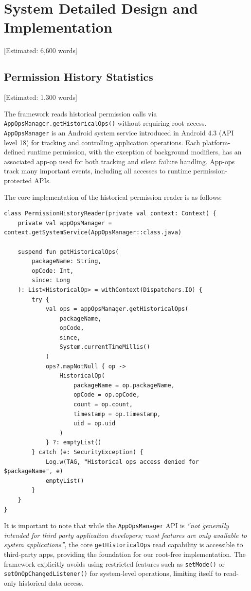 \newpage\section{System Detailed Design and Implementation} [Estimated: 6,600 words]

\subsection{Permission History Statistics} [Estimated: 1,300 words]

The framework reads historical permission calls via \texttt{AppOpsManager.getHistoricalOps()} without requiring root access. \texttt{AppOpsManager} is an Android system service introduced in Android 4.3 (API level 18) for tracking and controlling application operations. Each platform-defined runtime permission, with the exception of background modifiers, has an associated app-op used for both tracking and silent failure handling. App-ops track many important events, including all accesses to runtime permission-protected APIs.

The core implementation of the historical permission reader is as follows:

\begin{lstlisting}[caption=Historical permission reading implementation]
class PermissionHistoryReader(private val context: Context) {
    private val appOpsManager = context.getSystemService(AppOpsManager::class.java)
    
    suspend fun getHistoricalOps(
        packageName: String, 
        opCode: Int, 
        since: Long
    ): List<HistoricalOp> = withContext(Dispatchers.IO) {
        try {
            val ops = appOpsManager.getHistoricalOps(
                packageName,
                opCode,
                since,
                System.currentTimeMillis()
            )
            ops?.mapNotNull { op ->
                HistoricalOp(
                    packageName = op.packageName,
                    opCode = op.opCode,
                    count = op.count,
                    timestamp = op.timestamp,
                    uid = op.uid
                )
            } ?: emptyList()
        } catch (e: SecurityException) {
            Log.w(TAG, "Historical ops access denied for $packageName", e)
            emptyList()
        }
    }
}
\end{lstlisting}

It is important to note that while the \texttt{AppOpsManager} API is \textit{``not generally intended for third party application developers; most features are only available to system applications''}, the core \texttt{getHistoricalOps} read capability is accessible to third-party apps, providing the foundation for our root-free implementation. The framework explicitly avoids using restricted features such as \texttt{setMode()} or \texttt{setOnOpChangedListener()} for system-level operations, limiting itself to read-only historical data access.

